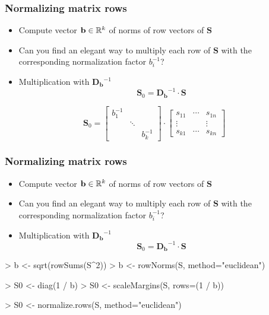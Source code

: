 \documentclass[t]{beamer} %
\begin{document}
\begin{frame}
  \frametitle{Normalizing matrix rows}
  
  \begin{itemize}
  \item Compute vector $\mathbf{b} \in \mathbb{R}^k$ of norms of row vectors of $\mathbf{S}$
  \item Can you find an elegant way to multiply each row of $\mathbf{S}$ with the corresponding normalization factor $b_i^{-1}$?
  \item<2-> Multiplication with  $\mathbf{D_b}^{-1}$
    \[
    \mathbf{S}_0 = \mathbf{D_b}^{-1} \cdot \mathbf{S}
    \]
  \end{itemize}
  
  \ungap[1]
  \[
  \mathbf{S}_0 =
  \begin{bmatrix}
    b_1^{-1} & & \\
    & \ddots & \\
    & & b_k^{-1}
  \end{bmatrix}
  \cdot
  \begin{bmatrix}
    s_{11} & \cdots & s_{1n} \\
    \vdots & & \vdots \\
    s_{k1} & \cdots & s_{kn}
  \end{bmatrix}
  \]
\end{frame}

\begin{frame}[fragile]
  \frametitle{Normalizing matrix rows}
  
  \begin{itemize}
  \item Compute vector $\mathbf{b} \in \mathbb{R}^k$ of norms of row vectors of $\mathbf{S}$
  \item Can you find an elegant way to multiply each row of $\mathbf{S}$ with the corresponding normalization factor $b_i^{-1}$?
  \item Multiplication with  $\mathbf{D_b}^{-1}$
    \[
    \mathbf{S}_0 = \mathbf{D_b}^{-1} \cdot \mathbf{S}
    \]
  \end{itemize}
  
\begin{Rcode}
> b <- sqrt(rowSums(S^2))
> b <- rowNorms(S, method="euclidean") 

> S0 <- diag(1 / b) %
> S0 <- scaleMargins(S, rows=(1 / b))  

> S0 <- normalize.rows(S, method="euclidean") 
\end{Rcode}
\end{frame}
\end{document}
